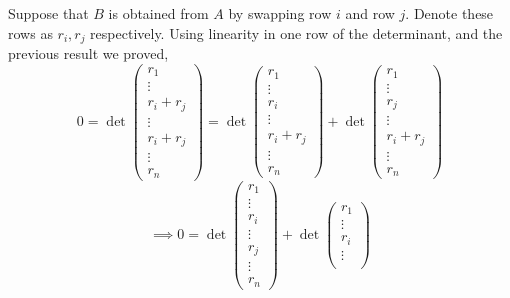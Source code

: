 \documentclass{eh-homework}
\begin{document}
\begin{question}{4}
    Suppose that \(B\) is obtained from \(A\) by swapping row \(i\) and row \(j\). Denote these rows as \(r_i,r_j\) respectively. Using linearity in one row of the determinant, and the previous result we proved,
    \[
        0 = \det \begin{pmatrix}
             r_1 \\
             \vdots \\
             r_i + r_j\\
             \vdots \\
             r_i + r_j \\
             \vdots \\
             r_n
        \end{pmatrix} =
        \det \begin{pmatrix}
            r_1 \\
            \vdots \\
            r_i\\
            \vdots \\
            r_i + r_j \\
            \vdots \\
            r_n
       \end{pmatrix} +
       \det \begin{pmatrix}
            r_1 \\
            \vdots \\
            r_j\\
            \vdots \\
            r_i + r_j \\
            \vdots \\
            r_n
        \end{pmatrix}
    \]
    \[
        \implies 0 = \det \begin{pmatrix}
            r_1 \\
            \vdots \\
            r_i\\
            \vdots \\
            r_j \\
            \vdots \\
            r_n
       \end{pmatrix}+
       \det \begin{pmatrix}
            r_1 \\
            \vdots \\
            r_i\\
            \vdots \\

\end{pmatrix}\]
\end{question}
\end{document}
